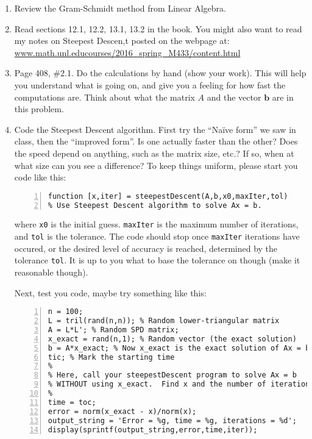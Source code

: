 \documentclass[12pt]{article}
\theoremstyle{plain}
\theoremstyle{definition}
\theoremstyle{remark}
\numberwithin{equation}{section} %
\numberwithin{figure}{section}   %
\begin{document}
\begin{enumerate}
\item Review the Gram-Schmidt method from Linear Algebra.
\item Read sections 12.1, 12.2, 13.1, 13.2 in the book.  You might also want to read my notes on Steepest Descen,t posted on the webpage at:\\ \url{www.math.unl.educourses/2016_spring_M433/content.html}
\item Page 408, \#2.1.  Do the calculations by hand (show your work).  This will help you understand what is going on, and give you a feeling for how fast the computations are.  Think about what the matrix $A$ and the vector $\mathbf{b}$ are in this problem.
\item Code the Steepest Descent algorithm.  First try the ``Na\"ive form'' we saw in class, then the ``improved form''.  Is one actually faster than the other?  Does the speed depend on anything, such as the matrix size, etc.?  If so, when at what size can you see a difference?  To keep things uniform, please start you code like this:


\begin{minipage}[h]{5in}
\centering
\begin{lstlisting}[numbers=left,firstnumber=1]
function [x,iter] = steepestDescent(A,b,x0,maxIter,tol)
% Use Steepest Descent algorithm to solve Ax = b.
\end{lstlisting}
\end{minipage}

where \texttt{x0} is the initial guess.  \texttt{maxIter} is the maximum number of iterations, and \texttt{tol} is the tolerance.  The code should stop once \texttt{maxIter} iterations have occured, or the desired level of accuracy is reached, determined by the tolerance \texttt{tol}. It is up to you what to base the tolerance on though (make it reasonable though).  

\pagebreak

\thispagestyle{empty}

Next, test you code, maybe try something like this:

\begin{minipage}[h]{5in}
\centering
\begin{lstlisting}[numbers=left,firstnumber=1]
% A program to test linear solvers.
n = 100;
L = tril(rand(n,n)); % Random lower-triangular matrix
A = L*L'; % Random SPD matrix;
x_exact = rand(n,1); % Random vector (the exact solution)
b = A*x_exact; % Now x_exact is the exact solution of Ax = b.
tic; % Mark the starting time
%
% Here, call your steepestDescent program to solve Ax = b 
% WITHOUT using x_exact.  Find x and the number of iterations.
%
time = toc;
error = norm(x_exact - x)/norm(x);
output_string = 'Error = %g, time = %g, iterations = %d';
display(sprintf(output_string,error,time,iter));
\end{lstlisting}
\end{minipage}


\end{enumerate}
\end{document}
